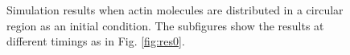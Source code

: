 \documentclass[a4paper,12pt, oneside]{book}
\begin{document}
\begin{figure}[tbp]
 \caption{Simulation results when actin molecules are distributed in a circular region as an initial condition. The subfigures show the results at different timings as in Fig. \ref{fig:res0}.}
 \label{fig:res5}
\end{figure}
\end{document}
